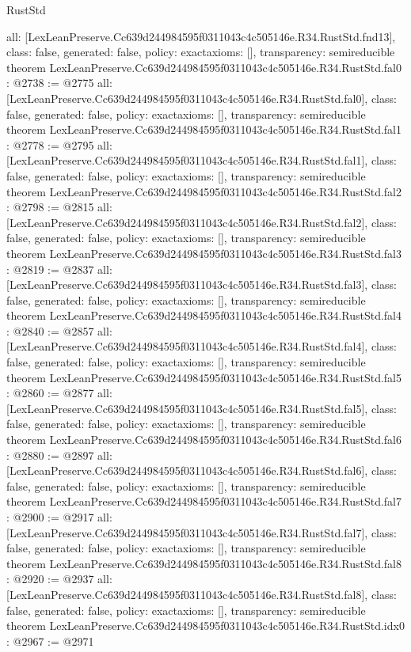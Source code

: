 \begin{lexlean}{RustStd}
\begin{coremodule}
{  all: [LexLeanPreserve.Cc639d244984595f0311043c4c505146e.R34.RustStd.fnd13],
  class: false,
  generated: false,
  policy: exact{axioms: []},
  transparency: semireducible
}
theorem LexLeanPreserve.Cc639d244984595f0311043c4c505146e.R34.RustStd.fal0 : @2738 := @2775 {
  all: [LexLeanPreserve.Cc639d244984595f0311043c4c505146e.R34.RustStd.fal0],
  class: false,
  generated: false,
  policy: exact{axioms: []},
  transparency: semireducible
}
theorem LexLeanPreserve.Cc639d244984595f0311043c4c505146e.R34.RustStd.fal1 : @2778 := @2795 {
  all: [LexLeanPreserve.Cc639d244984595f0311043c4c505146e.R34.RustStd.fal1],
  class: false,
  generated: false,
  policy: exact{axioms: []},
  transparency: semireducible
}
theorem LexLeanPreserve.Cc639d244984595f0311043c4c505146e.R34.RustStd.fal2 : @2798 := @2815 {
  all: [LexLeanPreserve.Cc639d244984595f0311043c4c505146e.R34.RustStd.fal2],
  class: false,
  generated: false,
  policy: exact{axioms: []},
  transparency: semireducible
}
theorem LexLeanPreserve.Cc639d244984595f0311043c4c505146e.R34.RustStd.fal3 : @2819 := @2837 {
  all: [LexLeanPreserve.Cc639d244984595f0311043c4c505146e.R34.RustStd.fal3],
  class: false,
  generated: false,
  policy: exact{axioms: []},
  transparency: semireducible
}
theorem LexLeanPreserve.Cc639d244984595f0311043c4c505146e.R34.RustStd.fal4 : @2840 := @2857 {
  all: [LexLeanPreserve.Cc639d244984595f0311043c4c505146e.R34.RustStd.fal4],
  class: false,
  generated: false,
  policy: exact{axioms: []},
  transparency: semireducible
}
theorem LexLeanPreserve.Cc639d244984595f0311043c4c505146e.R34.RustStd.fal5 : @2860 := @2877 {
  all: [LexLeanPreserve.Cc639d244984595f0311043c4c505146e.R34.RustStd.fal5],
  class: false,
  generated: false,
  policy: exact{axioms: []},
  transparency: semireducible
}
theorem LexLeanPreserve.Cc639d244984595f0311043c4c505146e.R34.RustStd.fal6 : @2880 := @2897 {
  all: [LexLeanPreserve.Cc639d244984595f0311043c4c505146e.R34.RustStd.fal6],
  class: false,
  generated: false,
  policy: exact{axioms: []},
  transparency: semireducible
}
theorem LexLeanPreserve.Cc639d244984595f0311043c4c505146e.R34.RustStd.fal7 : @2900 := @2917 {
  all: [LexLeanPreserve.Cc639d244984595f0311043c4c505146e.R34.RustStd.fal7],
  class: false,
  generated: false,
  policy: exact{axioms: []},
  transparency: semireducible
}
theorem LexLeanPreserve.Cc639d244984595f0311043c4c505146e.R34.RustStd.fal8 : @2920 := @2937 {
  all: [LexLeanPreserve.Cc639d244984595f0311043c4c505146e.R34.RustStd.fal8],
  class: false,
  generated: false,
  policy: exact{axioms: []},
  transparency: semireducible
}
theorem LexLeanPreserve.Cc639d244984595f0311043c4c505146e.R34.RustStd.idx0 : @2967 := @2971 {
}
\end{coremodule}
\end{lexlean}
